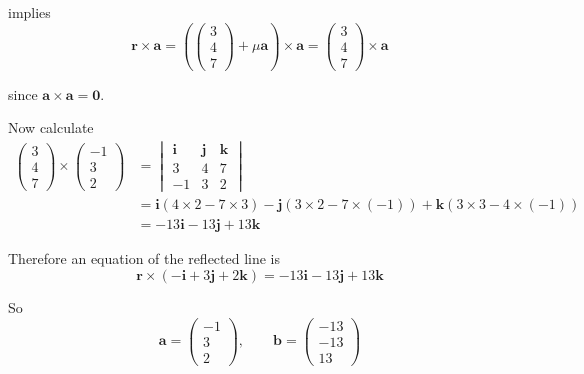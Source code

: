 \documentclass[leqno]{article}
\begin{document}
\begin{enumerate}[
  label=\textbf{\arabic*.},
  leftmargin=*,
  topsep=0pt,
  partopsep=0pt,
  parsep=0pt
]
\begin{djsSolution}
\begin{enumerate}[label=\textbf{(\alph*)}]
  implies
  \[
  \mathbf r\times\mathbf a=\left(\begin{pmatrix}3\\4\\7\end{pmatrix}+\mu\mathbf a\right)\times\mathbf a=\begin{pmatrix}3\\4\\7\end{pmatrix}\times\mathbf a
  \]

  since \(\mathbf a\times\mathbf a=\mathbf 0\).

  Now calculate
  \begin{align*}
  \begin{pmatrix}3\\4\\7\end{pmatrix}\times\begin{pmatrix}-1\\3\\2\end{pmatrix}
  &=\begin{vmatrix}
  \mathbf i & \mathbf j & \mathbf k\\
  3&4&7\\
  -1&3&2
  \end{vmatrix}\\
  &=\mathbf i(4\times 2-7\times 3)-\mathbf j(3\times 2-7\times(-1))+\mathbf k(3\times 3-4\times(-1))\\
  &=-13\mathbf i-13\mathbf j+13\mathbf k
  \end{align*}

  Therefore an equation of the reflected line is
  \[
  \mathbf r\times(-\mathbf i+3\mathbf j+2\mathbf k)=-13\mathbf i-13\mathbf j+13\mathbf k
  \]

  So
  \[
  \mathbf a=\begin{pmatrix}-1\\3\\2\end{pmatrix},\qquad \mathbf b=\begin{pmatrix}-13\\-13\\13\end{pmatrix}
  \]
\end{enumerate}
\end{djsSolution}


\newpage

\questionitem


\end{enumerate}
\end{document}
